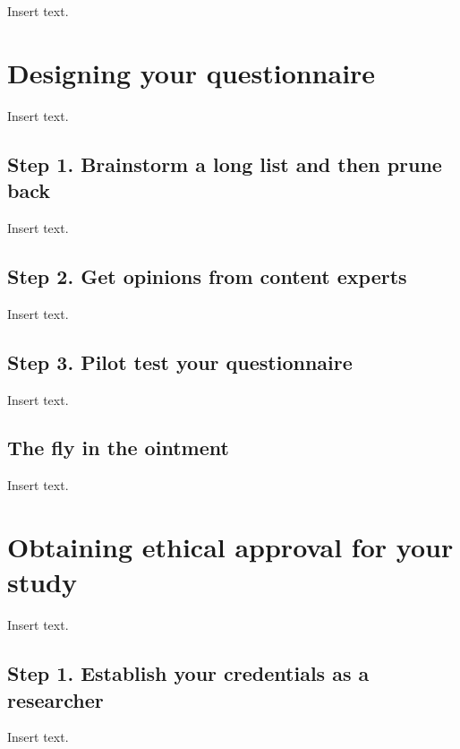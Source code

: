 \documentclass[
  letterpaper,
  DIV=11,
  numbers=noendperiod]{scrreprt}
\begin{document}
Insert text.


\chapter{Designing your
questionnaire}\label{designing-your-questionnaire}

Insert text.

\section{Step 1. Brainstorm a long list and then prune
back}\label{step-1.-brainstorm-a-long-list-and-then-prune-back}

Insert text.

\section{Step 2. Get opinions from content
experts}\label{step-2.-get-opinions-from-content-experts}

Insert text.

\section{Step 3. Pilot test your
questionnaire}\label{step-3.-pilot-test-your-questionnaire}

Insert text.

\section{The fly in the ointment}\label{the-fly-in-the-ointment-4}

Insert text.


\chapter{Obtaining ethical approval for your
study}\label{obtaining-ethical-approval-for-your-study}

Insert text.

\section{Step 1. Establish your credentials as a
researcher}\label{step-1.-establish-your-credentials-as-a-researcher}

Insert text.
\end{document}
